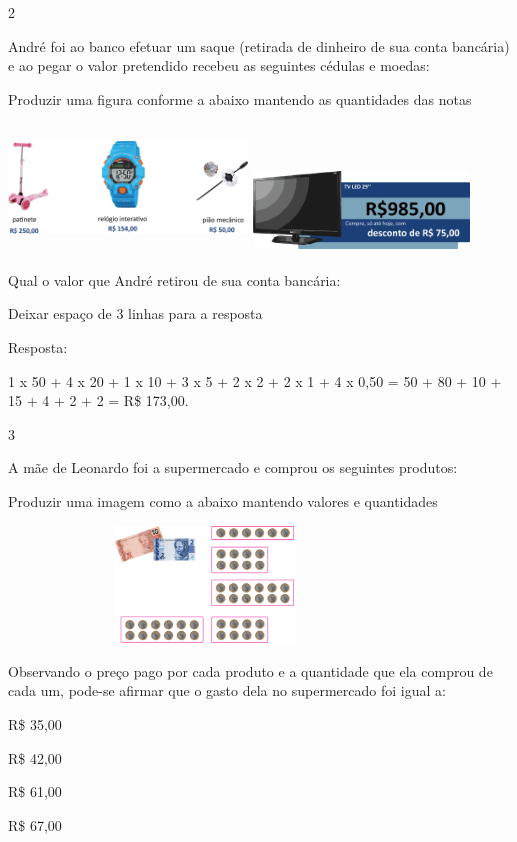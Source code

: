 \num{2}

André foi ao banco efetuar um saque (retirada de dinheiro de sua conta
bancária) e ao pegar o valor pretendido recebeu as seguintes cédulas e
moedas:

Produzir uma figura conforme a abaixo mantendo as quantidades das notas

\includegraphics[width=2.50022in,height=1.34178in]{media/image72.png}
\includegraphics[width=2.26686in,height=0.87508in]{media/image73.png}

Qual o valor que André retirou de sua conta bancária:

Deixar espaço de 3 linhas para a resposta

Resposta:

1 x 50 + 4 x 20 + 1 x 10 + 3 x 5 + 2 x 2 + 2 x 1 + 4 x 0,50 = 50 + 80 +
10 + 15 + 4 + 2 + 2 = R\$ 173,00.

\num{3}

A mãe de Leonardo foi a supermercado e comprou os seguintes produtos:

Produzir uma imagem como a abaixo mantendo valores e quantidades

\includegraphics[width=4.10036in,height=1.22511in]{media/image74.png}

Observando o preço pago por cada produto e a quantidade que ela comprou
de cada um, pode-se afirmar que o gasto dela no supermercado foi igual
a:

\begin{escolha}

\item
  R\$ 35,00
\item
  R\$ 42,00
\item
  R\$ 61,00
\item
  R\$ 67,00
\end{escolha}

